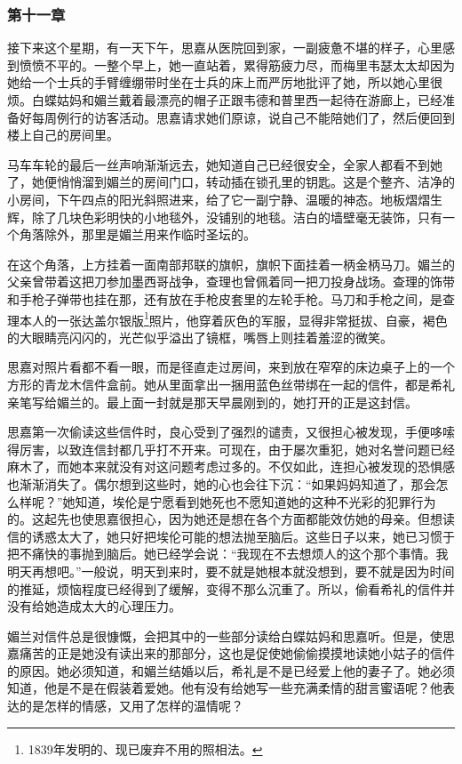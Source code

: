 \subsubsection{第十一章}

\par 接下来这个星期，有一天下午，思嘉从医院回到家，一副疲惫不堪的样子，心里感到愤愤不平的。一整个早上，她一直站着，累得筋疲力尽，而梅里韦瑟太太却因为她给一个士兵的手臂缠绷带时坐在士兵的床上而严厉地批评了她，所以她心里很烦。白蝶姑妈和媚兰戴着最漂亮的帽子正跟韦德和普里西一起待在游廊上，已经准备好每周例行的访客活动。思嘉请求她们原谅，说自己不能陪她们了，然后便回到楼上自己的房间里。
\par 马车车轮的最后一丝声响渐渐远去，她知道自己已经很安全，全家人都看不到她了，她便悄悄溜到媚兰的房间门口，转动插在锁孔里的钥匙。这是个整齐、洁净的小房间，下午四点的阳光斜照进来，给了它一副宁静、温暖的神态。地板熠熠生辉，除了几块色彩明快的小地毯外，没铺别的地毯。洁白的墙壁毫无装饰，只有一个角落除外，那里是媚兰用来作临时圣坛的。
\par 在这个角落，上方挂着一面南部邦联的旗帜，旗帜下面挂着一柄金柄马刀。媚兰的父亲曾带着这把刀参加墨西哥战争，查理也曾佩着同一把刀投身战场。查理的饰带和手枪子弹带也挂在那，还有放在手枪皮套里的左轮手枪。马刀和手枪之间，是查理本人的一张达盖尔银版\footnote{1839年发明的、现已废弃不用的照相法。}照片，他穿着灰色的军服，显得非常挺拔、自豪，褐色的大眼睛亮闪闪的，光芒似乎溢出了镜框，嘴唇上则挂着羞涩的微笑。
\par 思嘉对照片看都不看一眼，而是径直走过房间，来到放在窄窄的床边桌子上的一个方形的青龙木信件盒前。她从里面拿出一捆用蓝色丝带绑在一起的信件，都是希礼亲笔写给媚兰的。最上面一封就是那天早晨刚到的，她打开的正是这封信。
\par 思嘉第一次偷读这些信件时，良心受到了强烈的谴责，又很担心被发现，手便哆嗦得厉害，以致连信封都几乎打不开来。可现在，由于屡次重犯，她对名誉问题已经麻木了，而她本来就没有对这问题考虑过多的。不仅如此，连担心被发现的恐惧感也渐渐消失了。偶尔想到这些时，她的心也会往下沉：“如果妈妈知道了，那会怎么样呢？”她知道，埃伦是宁愿看到她死也不愿知道她的这种不光彩的犯罪行为的。这起先也使思嘉很担心，因为她还是想在各个方面都能效仿她的母亲。但想读信的诱惑太大了，她只好把埃伦可能的想法抛至脑后。这些日子以来，她已习惯于把不痛快的事抛到脑后。她已经学会说：“我现在不去想烦人的这个那个事情。我明天再想吧。”一般说，明天到来时，要不就是她根本就没想到，要不就是因为时间的推延，烦恼程度已经得到了缓解，变得不那么沉重了。所以，偷看希礼的信件并没有给她造成太大的心理压力。
\par 媚兰对信件总是很慷慨，会把其中的一些部分读给白蝶姑妈和思嘉听。但是，使思嘉痛苦的正是她没有读出来的那部分，这也是促使她偷偷摸摸地读她小姑子的信件的原因。她必须知道，和媚兰结婚以后，希礼是不是已经爱上他的妻子了。她必须知道，他是不是在假装着爱她。他有没有给她写一些充满柔情的甜言蜜语呢？他表达的是怎样的情感，又用了怎样的温情呢？

